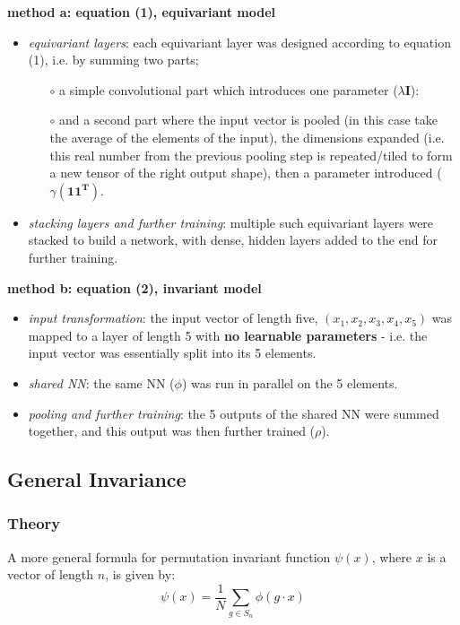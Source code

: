 \documentclass{article}
\begin{document}
\noindent \textbf{method a: equation (1), equivariant model}
\begin{itemize}
    \item \emph{equivariant layers}: each equivariant layer was designed according to equation (1), i.e. by summing two parts;
    \begin{itemize}
        \item[$\circ$] a simple convolutional part which introduces one parameter ($\lambda \boldsymbol{I}$):
        \item[$\circ$] and a second part where the input vector is pooled (in this case take the average of the elements of the input), the dimensions expanded (i.e. this real number from the previous pooling step is repeated/tiled to form a new tensor of the right output shape), then a parameter introduced ($\gamma \left(\boldsymbol{1}\boldsymbol{1^T}\right)$. 
    \end{itemize} 
    \item \emph{stacking layers and further training}: multiple such equivariant layers were stacked to build a network, with dense, hidden layers added to the end for further training.
\end{itemize}

\noindent \textbf{method b: equation (2), invariant model}

\begin{itemize}
    \item \emph{input transformation}: the input vector of length five, $(x_1, x_2, x_3, x_4, x_5)$ was mapped to a layer of length 5 with \textbf{no learnable parameters} - i.e. the input vector was essentially split into its 5 elements.
    \item \emph{shared NN}: the same NN ($\phi$) was run in parallel on the 5 elements.
    \item \emph{pooling and further training}: the 5 outputs of the shared NN were summed together, and this output was then further trained ($\rho$).

\end{itemize}

\subsection{General Invariance}
\subsubsection{Theory}
A more general formula for permutation invariant function $\psi(x)$, where $x$ is a vector of length $n$, is given by:
\begin{equation}
    \psi(x) =  \frac{1}{N}\sum_{g \in S_n}{\phi\left(g \cdot x\right)}
\end{equation}
\end{document}
